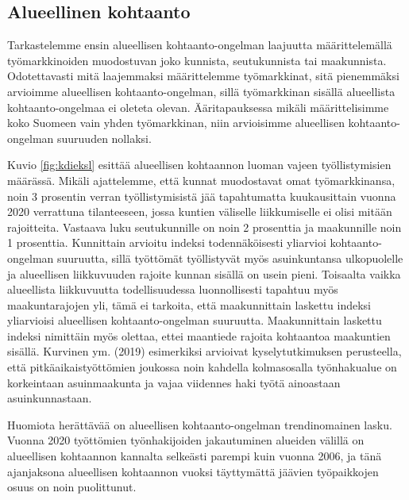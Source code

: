 \documentclass[12pt]{article}
\begin{document}
\subsection{Alueellinen kohtaanto} \label{section:alueellinen_kohtaanto}

Tarkastelemme ensin alueellisen kohtaanto-ongelman laajuutta määrittelemällä työmarkkinoiden muodostuvan joko kunnista, seutukunnista tai maakunnista. Odotettavasti mitä laajemmaksi määrittelemme työmarkkinat, sitä pienemmäksi arvioimme alueellisen kohtaanto-ongelman, sillä työmarkkinan sisällä alueellista kohtaanto-ongelmaa ei oleteta olevan. Ääritapauksessa mikäli määrittelisimme koko Suomeen vain yhden työmarkkinan, niin arvioisimme alueellisen kohtaanto-ongelman suuruuden nollaksi.

Kuvio \ref{fig:kdieksl} esittää alueellisen kohtaannon luoman vajeen työllistymisien määrässä. Mikäli ajattelemme, että kunnat muodostavat omat työmarkkinansa, noin 3 prosentin verran työllistymisistä jää tapahtumatta kuukausittain vuonna 2020 verrattuna tilanteeseen, jossa kuntien väliselle liikkumiselle ei olisi mitään rajoitteita. Vastaava luku seutukunnille on noin 2 prosenttia ja maakunnille noin 1 prosenttia. Kunnittain arvioitu indeksi todennäköisesti yliarvioi kohtaanto-ongelman suuruutta, sillä työttömät työllistyvät myös asuinkuntansa ulkopuolelle \cite{alasalmi2020tyon} ja alueellisen liikkuvuuden rajoite kunnan sisällä on usein pieni. Toisaalta vaikka alueellista liikkuvuutta todellisuudessa luonnollisesti tapahtuu myös maakuntarajojen yli, tämä ei tarkoita, että maakunnittain laskettu indeksi yliarvioisi alueellisen kohtaanto-ongelman suuruutta. Maakunnittain laskettu indeksi nimittäin myös olettaa, ettei maantiede rajoita kohtaantoa maakuntien sisällä. Kurvinen ym. (2019) esimerkiksi arvioivat kyselytutkimuksen perusteella, että pitkäaikaistyöttömien joukossa noin kahdella kolmasosalla työnhakualue on korkeintaan asuinmaakunta ja vajaa viidennes haki työtä ainoastaan asuinkunnastaan.  

Huomiota herättävää on alueellisen kohtaanto-ongelman trendinomainen lasku. Vuonna 2020 työttömien työnhakijoiden jakautuminen alueiden välillä on alueellisen kohtaannon kannalta selkeästi parempi kuin vuonna 2006, ja tänä ajanjaksona alueellisen kohtaannon vuoksi täyttymättä jäävien työpaikkojen osuus on noin puolittunut.

\end{document}

